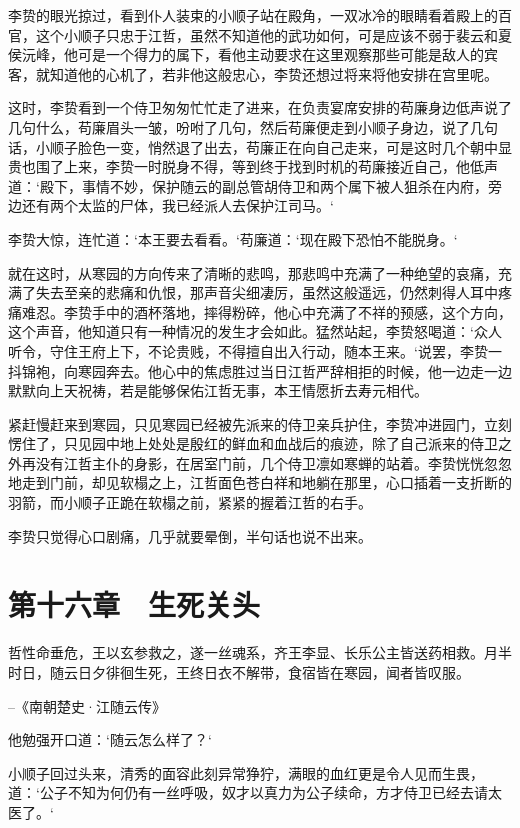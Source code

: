 李贽的眼光掠过，看到仆人装束的小顺子站在殿角，一双冰冷的眼睛看着殿上的百官，这个小顺子只忠于江哲，虽然不知道他的武功如何，可是应该不弱于裴云和夏侯沅峰，他可是一个得力的属下，看他主动要求在这里观察那些可能是敌人的宾客，就知道他的心机了，若非他这般忠心，李贽还想过将来将他安排在宫里呢。

这时，李贽看到一个侍卫匆匆忙忙走了进来，在负责宴席安排的苟廉身边低声说了几句什么，苟廉眉头一皱，吩咐了几句，然后苟廉便走到小顺子身边，说了几句话，小顺子脸色一变，悄然退了出去，苟廉正在向自己走来，可是这时几个朝中显贵也围了上来，李贽一时脱身不得，等到终于找到时机的苟廉接近自己，他低声道：‘殿下，事情不妙，保护随云的副总管胡侍卫和两个属下被人狙杀在内府，旁边还有两个太监的尸体，我已经派人去保护江司马。‘

李贽大惊，连忙道：‘本王要去看看。‘苟廉道：‘现在殿下恐怕不能脱身。‘

就在这时，从寒园的方向传来了清晰的悲鸣，那悲鸣中充满了一种绝望的哀痛，充满了失去至亲的悲痛和仇恨，那声音尖细凄厉，虽然这般遥远，仍然刺得人耳中疼痛难忍。李贽手中的酒杯落地，摔得粉碎，他心中充满了不祥的预感，这个方向，这个声音，他知道只有一种情况的发生才会如此。猛然站起，李贽怒喝道：‘众人听令，守住王府上下，不论贵贱，不得擅自出入行动，随本王来。‘说罢，李贽一抖锦袍，向寒园奔去。他心中的焦虑胜过当日江哲严辞相拒的时候，他一边走一边默默向上天祝祷，若是能够保佑江哲无事，本王情愿折去寿元相代。

紧赶慢赶来到寒园，只见寒园已经被先派来的侍卫亲兵护住，李贽冲进园门，立刻愣住了，只见园中地上处处是殷红的鲜血和血战后的痕迹，除了自己派来的侍卫之外再没有江哲主仆的身影，在居室门前，几个侍卫凛如寒蝉的站着。李贽恍恍忽忽地走到门前，却见软榻之上，江哲面色苍白祥和地躺在那里，心口插着一支折断的羽箭，而小顺子正跪在软榻之前，紧紧的握着江哲的右手。

李贽只觉得心口剧痛，几乎就要晕倒，半句话也说不出来。

\chapter{第十六章　生死关头}

哲性命垂危，王以玄参救之，遂一丝魂系，齐王李显、长乐公主皆送药相救。月半时日，随云日夕徘徊生死，王终日衣不解带，食宿皆在寒园，闻者皆叹服。

--《南朝楚史·江随云传》

他勉强开口道：‘随云怎么样了？‘

小顺子回过头来，清秀的面容此刻异常狰狞，满眼的血红更是令人见而生畏，道：‘公子不知为何仍有一丝呼吸，奴才以真力为公子续命，方才侍卫已经去请太医了。‘

